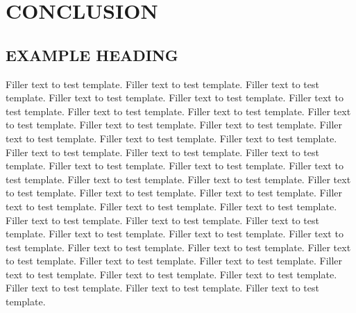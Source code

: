 
\chapter{CONCLUSION}

\section{EXAMPLE HEADING}

Filler text to test template. Filler text to test template. Filler text to
test template. Filler text to test template. Filler text to test template.
Filler text to test template. Filler text to test template. Filler text to
test template. Filler text to test template. Filler text to test template.
Filler text to test template. Filler text to test template. Filler text to
test template. Filler text to test template. Filler text to test template.
Filler text to test template. Filler text to test template. Filler text to
test template. Filler text to test template. Filler text to test template.
Filler text to test template. Filler text to test template. Filler text to
test template. Filler text to test template. Filler text to test template.
Filler text to test template. Filler text to test template. Filler text to
test template. Filler text to test template. Filler text to test template.
Filler text to test template. Filler text to test template. Filler text to
test template. Filler text to test template. Filler text to test template.
Filler text to test template. Filler text to test template. Filler text to
test template. Filler text to test template. Filler text to test template.
Filler text to test template. Filler text to test template. Filler text to
test template. Filler text to test template. Filler text to test template.

